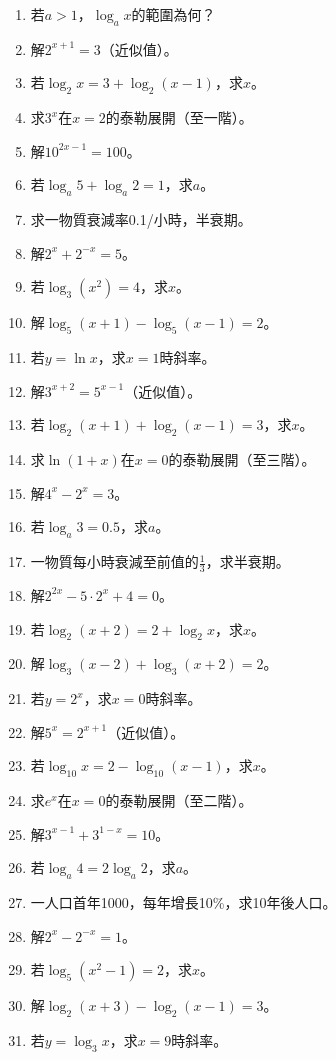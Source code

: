 \begin{enumerate}[label=\arabic*.]
    \item 若$a > 1$，$\log_a x$的範圍為何？
    \item 解$2^{x+1} = 3$（近似值）。
    \item 若$\log_2 x = 3 + \log_2 (x-1)$，求$x$。
    \item 求$3^x$在$x = 2$的泰勒展開（至一階）。
    \item 解$10^{2x-1} = 100$。
    \item 若$\log_a 5 + \log_a 2 = 1$，求$a$。
    \item 求一物質衰減率0.1/小時，半衰期。
    \item 解$2^x + 2^{-x} = 5$。
    \item 若$\log_3 (x^2) = 4$，求$x$。
    \item 解$\log_5 (x+1) - \log_5 (x-1) = 2$。
    \item 若$y = \ln x$，求$x = 1$時斜率。
    \item 解$3^{x+2} = 5^{x-1}$（近似值）。
    \item 若$\log_2 (x+1) + \log_2 (x-1) = 3$，求$x$。
    \item 求$\ln (1+x)$在$x = 0$的泰勒展開（至三階）。
    \item 解$4^x - 2^x = 3$。
    \item 若$\log_a 3 = 0.5$，求$a$。
    \item 一物質每小時衰減至前值的$\frac{1}{3}$，求半衰期。
    \item 解$2^{2x} - 5 \cdot 2^x + 4 = 0$。
    \item 若$\log_2 (x+2) = 2 + \log_2 x$，求$x$。
    \item 解$\log_3 (x-2) + \log_3 (x+2) = 2$。
    \item 若$y = 2^x$，求$x = 0$時斜率。
    \item 解$5^x = 2^{x+1}$（近似值）。
    \item 若$\log_{10} x = 2 - \log_{10} (x-1)$，求$x$。
    \item 求$e^x$在$x = 0$的泰勒展開（至二階）。
    \item 解$3^{x-1} + 3^{1-x} = 10$。
    \item 若$\log_a 4 = 2 \log_a 2$，求$a$。
    \item 一人口首年1000，每年增長10\%，求10年後人口。
    \item 解$2^x - 2^{-x} = 1$。
    \item 若$\log_5 (x^2 - 1) = 2$，求$x$。
    \item 解$\log_2 (x+3) - \log_2 (x-1) = 3$。
    \item 若$y = \log_3 x$，求$x = 9$時斜率。
\end{enumerate}

